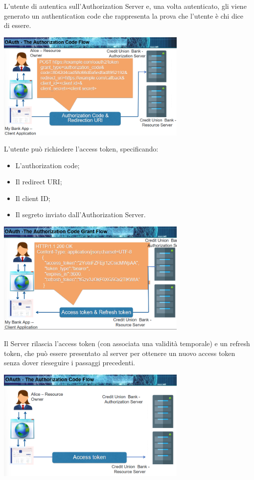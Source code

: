 \noindent L'utente di autentica sull'Authorization Server e, una volta autenticato, gli viene generato un authentication code che rappresenta la prova che l'utente è chi dice di essere. 

\begin{center}
    \includegraphics[width=0.7\textwidth]{images/11.png}
\end{center}

\noindent L'utente può richiedere l'access token, specificando:
\begin{itemize}
    \item L'authorization code;
    \item Il redirect URI;
    \item Il client ID;
    \item Il segreto inviato dall'Authorization Server.
\end{itemize}

\begin{center}
    \includegraphics[width=0.7\textwidth]{images/12.png}
\end{center}

\noindent Il Server rilascia l'access token (con associata una validità temporale) e un refresh token, che può essere presentato al server per ottenere un nuovo access token senza dover rieseguire i passaggi precedenti.
  
\begin{center}
    \includegraphics[width=0.7\textwidth]{images/13.png}
\end{center}

